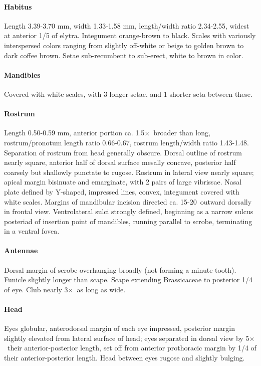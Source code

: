 \documentclass[fleqn,10pt,lineno]{wlpeerj} %
\newcommand{\td}{\textdegree~}
\newcommand{\x}{$\times$~}
\begin{document}
			\paragraph{Habitus}
				Length 3.39-3.70 mm, width 1.33-1.58 mm, length/width ratio 2.34-2.55, widest at anterior 1/5 of elytra.
				Integument orange-brown to black.
				Scales with variously interspersed colors ranging from slightly off-white or beige to golden brown to dark coffee brown.
				Setae sub-recumbent to sub-erect, white to brown in color.
			\paragraph{Mandibles}
				Covered with white scales, with 3 longer setae, and 1 shorter seta between these.
			\paragraph{Rostrum}
				Length 0.50-0.59 mm, anterior portion ca. 1.5\x broader than long, rostrum/pronotum length ratio 0.66-0.67, rostrum length/width ratio 1.43-1.48.
				Separation of rostrum from head generally obscure. 
				Dorsal outline of rostrum nearly square, anterior half of dorsal surface mesally concave, posterior half coarsely but shallowly punctate to rugose. 
				Rostrum in lateral view nearly square; apical margin bisinuate and emarginate, with 2 pairs of large vibrissae. 
				Nasal plate defined by Y-shaped, impressed lines, convex, integument covered with white scales.
				Margins of mandibular incision directed ca. 15-20\td outward dorsally in frontal view. 
				Ventrolateral sulci strongly defined, beginning as a narrow sulcus posteriad of insertion point of mandibles, running parallel to scrobe, terminating in a ventral fovea.
			\paragraph{Antennae}
				Dorsal margin of scrobe overhanging broadly (not forming a minute tooth).
				Funicle slightly longer than scape.
				Scape extending Brassicaceae  to posterior 1/4 of eye.
				Club nearly 3\x as long as wide.
			\paragraph{Head}
				Eyes globular, anterodorsal margin of each eye impressed, posterior margin slightly elevated from lateral surface of head; eyes separated in dorsal view by 5\x their anterior-posterior length, set off from anterior prothoracic margin by 1/4 of their anterior-posterior length.
				Head between eyes rugose and slightly bulging.
\end{document}
